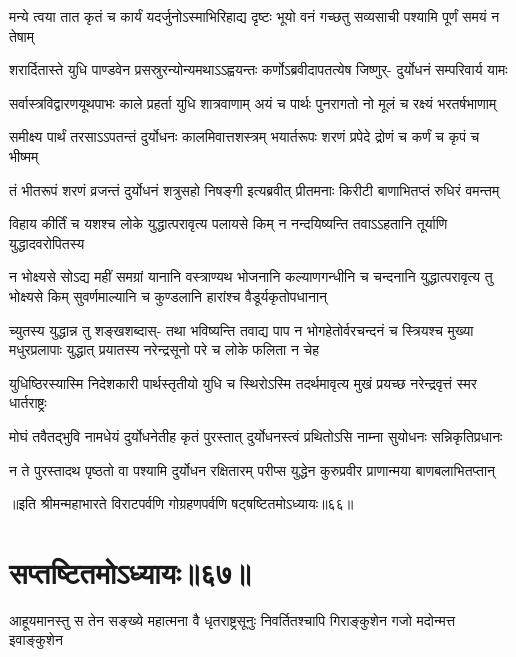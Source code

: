 \fourlineindentedshloka
{मन्ये त्वया तात कृतं च कार्यं}
{यदर्जुनोऽस्माभिरिहाद्य दृष्टः}
{भूयो वनं गच्छतु सव्यसाची}
{पश्यामि पूर्णं समयं न तेषाम्}



\fourlineindentedshloka
{शरार्दितास्ते युधि पाण्डवेन}
{प्रसस्रुरन्योन्यमथाऽऽह्वयन्तः}
{कर्णोऽब्रवीदापतत्येष जिष्णुर्-}
{दुर्योधनं सम्परिवार्य यामः}


\fourlineindentedshloka
{सर्वास्त्रविद्वारणयूथपाभः}
{काले प्रहर्ता युधि शात्रवाणाम्}
{अयं च पार्थः पुनरागतो नो}
{मूलं च रक्ष्यं भरतर्षभाणाम्}


\fourlineindentedshloka
{समीक्ष्य पार्थं तरसाऽऽपतन्तं}
{दुर्योधनः कालमिवात्तशस्त्रम्}
{भयार्तरूपः शरणं प्रपेदे}
{द्रोणं च कर्णं च कृपं च भीष्मम्}


\fourlineindentedshloka
{तं भीतरूपं शरणं व्रजन्तं}
{दुर्योधनं शत्रुसहो निषङ्गी}
{इत्यब्रवीत् प्रीतमनाः किरीटी}
{बाणाभितप्तं रुधिरं वमन्तम्}


\fourlineindentedshloka
{विहाय कीर्तिं च यशश्च लोके}
{युद्धात्परावृत्य पलायसे किम्}
{न नन्दयिष्यन्ति तवाऽऽहतानि}
{तूर्याणि युद्धादवरोपितस्य}


\sixlineindentedshloka
{न भोक्ष्यसे सोऽद्य महीं समग्रां}
{यानानि वस्त्राण्यथ भोजनानि}
{कल्याणगन्धीनि च चन्दनानि}
{युद्धात्परावृत्य तु भोक्ष्यसे किम्}
{सुवर्णमाल्यानि च कुण्डलानि}
{हारांश्च वैडूर्यकृतोपधानान्}


\sixlineindentedshloka
{च्युतस्य युद्धान्न तु शङ्खशब्दास्-}
{तथा भविष्यन्ति तवाद्य पाप}
{न भोगहेतोर्वरचन्दनं च}
{स्त्रियश्च मुख्या मधुरप्रलापाः}
{युद्धात् प्रयातस्य नरेन्द्रसूनो}
{परे च लोके फलिता न चेह}


\fourlineindentedshloka
{युधिष्ठिरस्यास्मि निदेशकारी}
{पार्थस्तृतीयो युधि च स्थिरोऽस्मि}
{तदर्थमावृत्य मुखं प्रयच्छ}
{नरेन्द्रवृत्तं स्मर धार्तराष्ट्रः}


\fourlineindentedshloka
{मोघं तवैतद्भुवि नामधेयं}
{दुर्योधनेतीह कृतं पुरस्तात्}
{दुर्योधनस्त्वं प्रथितोऽसि नाम्ना}
{सुयोधनः सन्निकृतिप्रधानः}



\fourlineindentedshloka
{न ते पुरस्तादथ पृष्ठतो वा}
{पश्यामि दुर्योधन रक्षितारम्}
{परीप्स युद्धेन कुरुप्रवीर}
{प्राणान्मया बाणबलाभितप्तान्}

॥इति श्रीमन्महाभारते विराटपर्वणि गोग्रहणपर्वणि षट्षष्टितमोऽध्यायः॥६६॥

\chapter{सप्तष्टितमोऽध्यायः॥६७॥}
\fourlineindentedshloka
{आहूयमानस्तु स तेन सङ्ख्ये}
{महात्मना वै धृतराष्ट्रसूनुः}
{निवर्तितश्चापि गिराङ्कुशेन}
{गजो मदोन्मत्त इवाङ्कुशेन}


